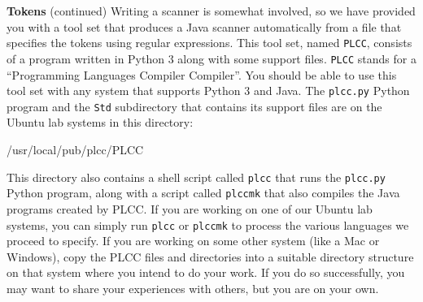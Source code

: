 \begin{minipage}[t]{\sw}
\slidenumber
\LARGE
{\bf Tokens} (continued)\exx
Writing a scanner is somewhat involved,
so we have provided you with a tool set
that produces a Java scanner automatically
from a file that specifies the tokens using regular expressions.
This tool set, named \verb'PLCC',
consists of a program written in Python 3
along with some support files.
\verb'PLCC' stands for a ``Programming Languages Compiler Compiler''.
You should be able to use this tool set with any system
that supports Python 3 and Java.
The \verb'plcc.py' Python program
and the \verb'Std' subdirectory that contains its support files
are on the Ubuntu lab systems in this directory:
\begin{qv}
/usr/local/pub/plcc/PLCC
\end{qv}
This directory also contains a shell script called \verb'plcc'
that runs the \verb'plcc.py' Python program,
along with a script called \verb'plccmk'
that also compiles the Java programs created by PLCC.\exx
If you are working on one of our Ubuntu lab systems,
you can simply run \verb'plcc' or \verb'plccmk'
to process the various languages we proceed to specify.\exx
If you are working on some other system (like a Mac or Windows),
copy the PLCC files and directories
into a suitable directory structure on that system
where you intend to do your work.
If you do so successfully, you may want to share your experiences
with others, but you are on your own.\exx
\end{minipage}
\clearpage
